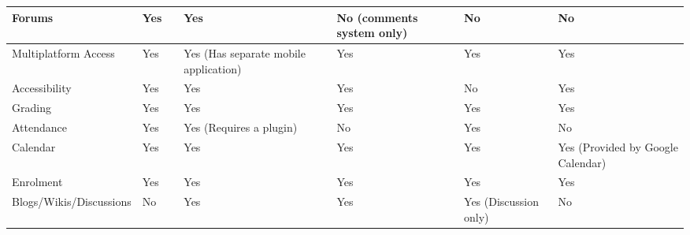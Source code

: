 \begin{table}[ht]
{\begin{tabular}{llllllll}
        \multicolumn{1}{|l|}{Forums}                      & \multicolumn{1}{l|}{Yes} & \multicolumn{1}{l|}{} & \multicolumn{1}{l|}{Yes} & \multicolumn{1}{l|}{} & \multicolumn{1}{l|}{No (comments system only)} & \multicolumn{1}{l|}{No} & \multicolumn{1}{l|}{No} \\ \hline
        \multicolumn{1}{|l|}{Multiplatform Access}        & \multicolumn{1}{l|}{Yes} & \multicolumn{1}{l|}{} & \multicolumn{1}{l|}{Yes (Has separate mobile application)} & \multicolumn{1}{l|}{} & \multicolumn{1}{l|}{Yes}                       & \multicolumn{1}{l|}{Yes} & \multicolumn{1}{l|}{Yes} \\ \hline
        \multicolumn{1}{|l|}{Accessibility}               & \multicolumn{1}{l|}{Yes} & \multicolumn{1}{l|}{} & \multicolumn{1}{l|}{Yes} & \multicolumn{1}{l|}{} & \multicolumn{1}{l|}{Yes}                       & \multicolumn{1}{l|}{No} & \multicolumn{1}{l|}{Yes} \\ \hline
        \multicolumn{1}{|l|}{Grading}                     & \multicolumn{1}{l|}{Yes} & \multicolumn{1}{l|}{} & \multicolumn{1}{l|}{Yes} & \multicolumn{1}{l|}{} & \multicolumn{1}{l|}{Yes}                       & \multicolumn{1}{l|}{Yes} & \multicolumn{1}{l|}{Yes} \\ \hline
        \multicolumn{1}{|l|}{Attendance}                  & \multicolumn{1}{l|}{Yes} & \multicolumn{1}{l|}{} & \multicolumn{1}{l|}{Yes (Requires a plugin)} & \multicolumn{1}{l|}{} & \multicolumn{1}{l|}{No}                        & \multicolumn{1}{l|}{Yes} & \multicolumn{1}{l|}{No} \\ \hline
        \multicolumn{1}{|l|}{Calendar}                    & \multicolumn{1}{l|}{Yes} & \multicolumn{1}{l|}{} & \multicolumn{1}{l|}{Yes} & \multicolumn{1}{l|}{} & \multicolumn{1}{l|}{Yes}                       & \multicolumn{1}{l|}{Yes} & \multicolumn{1}{l|}{Yes (Provided by Google Calendar)} \\ \hline
        \multicolumn{1}{|l|}{Enrolment}                   & \multicolumn{1}{l|}{Yes} & \multicolumn{1}{l|}{} & \multicolumn{1}{l|}{Yes} & \multicolumn{1}{l|}{} & \multicolumn{1}{l|}{Yes}                       & \multicolumn{1}{l|}{Yes} & \multicolumn{1}{l|}{Yes} \\ \hline
        \multicolumn{1}{|l|}{Blogs/Wikis/Discussions}     & \multicolumn{1}{l|}{No} & \multicolumn{1}{l|}{} & \multicolumn{1}{l|}{Yes} & \multicolumn{1}{l|}{} & \multicolumn{1}{l|}{Yes}                       & \multicolumn{1}{l|}{Yes (Discussion only)} & \multicolumn{1}{l|}{No} \\ \hline

\end{tabular}}
\end{table}
